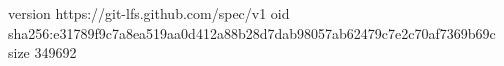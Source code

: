 version https://git-lfs.github.com/spec/v1
oid sha256:e31789f9c7a8ea519aa0d412a88b28d7dab98057ab62479c7e2c70af7369b69c
size 349692
